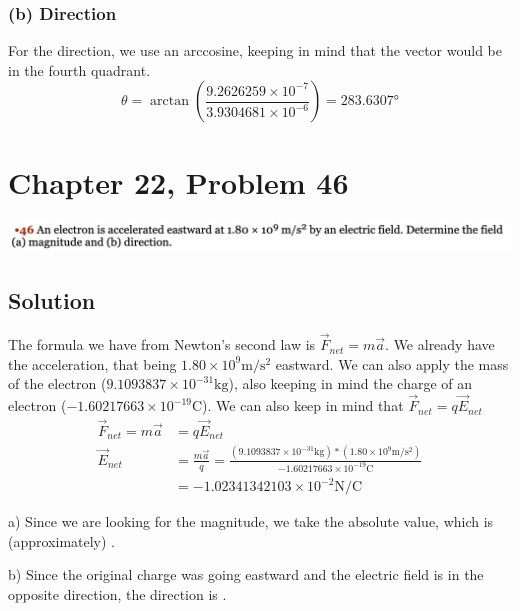\documentclass[12pt]{article}
\begin{document}
\subsubsection*{(b) Direction}
For the direction, we use an arccosine, keeping in mind that the vector would be in the fourth quadrant. 
\begin{equation*}
    \theta = \arctan\left(\frac{9.2626259 \times 10^{-7}}{3.9304681 \times 10^{-6}}\right)
        =   \boxed{283.6307 \unit{\degree}}
\end{equation*}


\pagebreak
\section*{Chapter 22, Problem 46}
\includegraphics[width=\textwidth]{picture_7.png}

\subsection*{Solution}
The formula we have from Newton's second law is $\vec{F}_{net} = m\vec{a}$. We already have the acceleration, that being $1.80 \times 10^9 \unit{\meter/\second^2}$ eastward. We can also apply the mass of the electron ($9.1093837 \times 10^{-31} \unit{\kilo\gram}$), also keeping in mind the charge of an electron ($-1.60217663 \times 10^{-19} \unit{\coulomb}$). We can also keep in mind that $\vec{F}_{net} = q \vec{E}_{net}$
\begin{align*}
    \vec{F}_{net}   =   m\vec{a}
        &=  q \vec{E}_{net}\\
    \vec{E}_{net}   &=  \frac{m\vec{a}}{q}
        =   \frac{(9.1093837 \times 10^{-31} \unit{\kilo\gram})*(1.80 \times 10^9 \unit{\meter/\second^2})}{-1.60217663 \times 10^{-19} \unit{\coulomb}}\\
        &=  -1.02341342103 \times 10^{-2} \unit{\newton/\coulomb}
\end{align*}

a) Since we are looking for the magnitude, we take the absolute value, which is (approximately) .

b) Since the original charge was going eastward and the electric field is in the opposite direction, the direction is .
\end{document}
